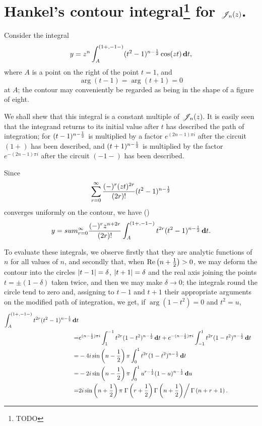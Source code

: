 \documentclass{book}
\begin{document}
\section[Hankel's contour integral for $\besJ_n(z)$.]{Hankel's contour integral\footnote{TODO} for $\besJ_n(z)$.}
Consider the integral
$$
y = z^n \int_A^{(1+,-1-)} (t^2-1)^{n-\frac{1}{2}} \cos(zt) \, \mathbf{d} t,
$$
where $A$ is a point on the right of the point $t=1$, and
$$
\arg(t-1) = \arg(t+1) = 0
$$
at $A$; the contour may conveniently be regarded as being in the shape
of a figure of eight.

We shall shew that this integral is a constant multiple of $\besJ_n(z)$.
It is easily seen that the integrand returns to its initial value
after $t$ has described the path of integration; for
$(t-1)^{n-\frac{1}{2}}$ is multiplied by a factor
$e^{(2n-1)\pi i}$ after the circuit $(1+)$ has been described, and
$(t+1)^{n-\frac{1}{2}}$ is multiplied by the factor
$e^{-(2n-1)\pi i}$ after the circuit $(-1-)$ has been described.

Since
$$
\sum_{r=0}^{\infty}
\frac{(-)^r (zt)^{2r}}{(2r)!}
(t^2-1)^{n-\frac{1}{2}}
$$
converges uniformly on the contour, we have ()
$$
y
=
sum_{r=0}^{\infty}
\frac{(-)^r z^{n+2r}}{(2r)!}
\int_A^{(1+,-1-)}
t^{2r}
(t^2-1)^{n-\frac{1}{2}}
\, \mathbf{d} t.
$$

To evaluate these integrals, we observe firstly that they are analytic
functions of $n$ for all values of $n$, and secondly that, when
$\mathrm{Re}\left( n+\frac{1}{2} \right) > 0$, we may deform the contour into the
circles $\left| t-1 \right|=\delta$, $\left| t+1 \right|=\delta$ and the real axis
joining the points $t = \pm (1-\delta)$ taken twice, and then we may
make $\delta \rightarrow 0$; the integrals round the circle tend to
zero and, assigning to $t-1$
% 
% 
and $t+1$ their appropriate arguments on the modified path of
integration, we get, if $\arg (1-t^2) = 0$ and $t^2 = u$,
\begin{align*}
  \int_A^{(1+,-1-)}
  t^{2r} (t^2-1)^{n-\frac{1}{2}} \, \mathbf{d} t
  \\
  =&
  e^{(n-\frac{1}{2}) \pi i}
  \int_1^{-1} t^{2r} (1-t^2)^{n-\frac{1}{2}} \, \mathbf{d} t
  + e^{-(n-\frac{1}{2}) \pi i}
  \int_{-1}^1 t^{2r} (1-t^2)^{n-\frac{1}{2}} \, \mathbf{d} t
  \\
  =&
  -4i
  \sin\left( n-\frac{1}{2} \right) 
  \pi
  \int_0^1 t^{2r} (1-t^2)^{n-\frac{1}{2}} \, \mathbf{d} t
  \\
  =&
  -2i \sin\left( n-\frac{1}{2} \right)
  \pi
  \int_0^1 u^{r-\frac{1}{2}} (1-u)^{n-\frac{1}{2}} \, \mathbf{d} u
  \\
  =&
  2i \sin\left(  n + \frac{1}{2}  \right)
  \pi
  \left.
    \Gamma \left( r + \frac{1}{2} \right)
    \Gamma \left(  n + \frac{1}{2}   \right)
  \right/
  \Gamma \left(  n + r + 1   \right).
\end{align*}
\end{document}
